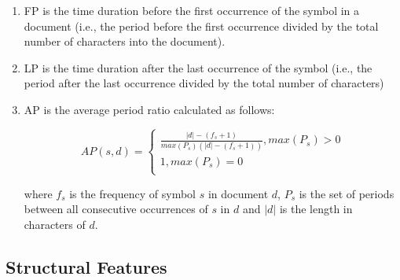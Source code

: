 \begin{enumerate}
\item FP is the time duration before the first occurrence of the symbol in a document (i.e., the period before the first occurrence divided by the total number of characters into the document).
\item LP is the time duration after the last occurrence of the symbol (i.e., the period after the last occurrence divided by the total number of characters)
\item AP is the average period ratio calculated as follows:

\begin{equation}\label{chap:relevant_work:sec:word_embendding}
	AP(s,d)  =
      \begin{cases}
        \frac{\vert d \vert - (f_s +1)}{max(P_s)(\vert d \vert - (f_s +1))}, max(P_s) > 0  \\
        1, max(P_s) = 0 \\ 
       \end{cases}
\end{equation}

\noindent
where $f_s$ is the frequency of symbol $s$ in document $d$, $P_s$ is the set of periods between all consecutive occurrences of $s$ in $d$ and $\vert d \vert$ is the length in characters of $d$. 

\end{enumerate}


\subsection{Structural Features}

